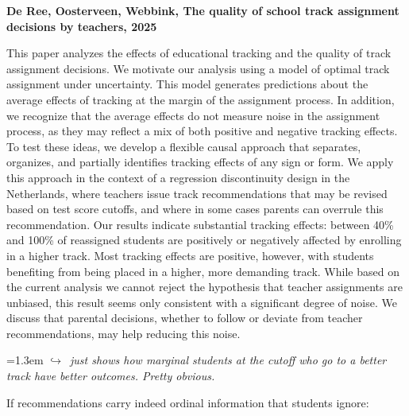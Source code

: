 \documentclass[11pt]{article}
\newcommand{\entry}[3]{%
  \par\medskip\noindent\textbf{#1}\par
  \nopagebreak #2\hspace{0.35em}{\small\color{tagcol}[#3]}\par}
\newcommand{\note}[1]{\par\smallskip\noindent\hangindent=1.3em
  \textcolor{notecol}{\footnotesize$\hookrightarrow$~\textit{#1}}}
\begin{document}
\entry{De Ree, Oosterveen, Webbink, The quality of school track assignment decisions by  teachers, 2025 }{This paper analyzes the effects of educational tracking and the quality of track assignment decisions. We motivate our analysis using a model of optimal track assignment under uncertainty. This model generates predictions about the average effects of tracking at the margin of the assignment process. In addition, we recognize that the average effects do not measure noise in the assignment process, as they may reflect a mix of both positive and negative tracking effects. To test these ideas, we develop a flexible causal approach that separates, organizes, and partially identifies tracking effects of any sign or form. We apply this approach in the context of a regression discontinuity design in the Netherlands, where teachers issue track recommendations that may be revised based on test score cutoffs, and where in some cases parents can overrule this recommendation. Our results indicate substantial tracking effects: between 40\% and 100\% of reassigned students are positively or negatively affected by enrolling in a higher track. Most tracking effects are positive, however, with students benefiting from being placed in a higher, more demanding track. While based on the current analysis we cannot reject the hypothesis that teacher assignments are unbiased, this result seems only consistent with a significant degree of noise. We discuss that parental decisions, whether to follow or deviate from teacher recommendations, may help reducing this noise.}{rt}
\note{just shows how marginal students at the cutoff who go to a better track have better outcomes. Pretty obvious. }


If recommendations carry indeed ordinal information that students ignore:
\end{document}
